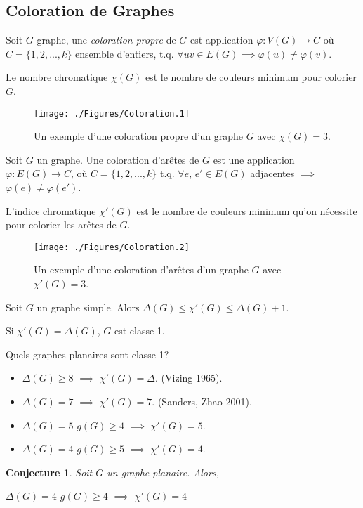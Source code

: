 \documentclass{beamer}
\newtheorem{conjecture}{Conjecture}
\begin{document}
\subsection{Coloration de Graphes}
\begin{frame}
Soit $G$ graphe, une \emph{coloration propre} de $G$ est application $\varphi: V(G) \to C$ où $C=\{1,2,...,k\}$ ensemble d'entiers, t.q. $\forall uv\in E(G) \implies\varphi(u) \neq \varphi(v)$. 

Le nombre chromatique $\chi(G)$ est le nombre de couleurs minimum pour colorier $G$.

\begin{figure}[ht]
\centerline{
\texttt{[image: ./Figures/Coloration.1]}
}
\caption{Un exemple d'une coloration propre d'un graphe $G$ avec $\chi(G)=3$.}
\end{figure}

\end{frame}
\begin{frame}
Soit $G$ un graphe. Une coloration d'arêtes de $G$ est une application $\varphi:E(G) \to C$, où $C=\{1,2,...,k\}$ t.q. $\forall e$, $e' \in E(G)$ adjacentes $\implies$ $\varphi(e) \neq \varphi(e')$. 

L'indice chromatique $\chi'(G)$ est le nombre de couleurs minimum qu'on nécessite pour colorier les arêtes de $G$.

\begin{figure}[ht]
\centerline{
\texttt{[image: ./Figures/Coloration.2]}
}
\caption{Un exemple d'une coloration d'arêtes d'un graphe $G$ avec $\chi'(G)=3$.}
\end{figure}
\end{frame}

\begin{frame}
\begin{theorem}[Vizing]
Soit $G$ un graphe simple. Alors $\Delta(G) \leq \chi'(G) \leq \Delta(G) + 1$.
\end{theorem}
Si $\chi'(G) = \Delta(G)$,  $G$ est classe 1.

\pause
Quels graphes planaires sont classe 1?
\begin{itemize}
\item $\Delta(G) \geq 8$ $\implies$ $\chi'(G)=\Delta$. (Vizing 1965).
\item $\Delta(G) = 7$ $\implies$ $\chi'(G)=7$. (Sanders, Zhao 2001).
\item $\Delta(G) = 5$ $g(G) \geq 4$ $\implies$ $\chi'(G) = 5$.
\item $\Delta(G) = 4$ $g(G) \geq 5$ $\implies$ $\chi'(G) = 4$.
\end{itemize}
\begin{conjecture}
Soit $G$ un graphe planaire. Alors,

$\Delta(G) = 4$ $g(G) \geq 4$ $\implies$ $\chi'(G) = 4$
\end{conjecture}
\end{frame}
\end{document}
